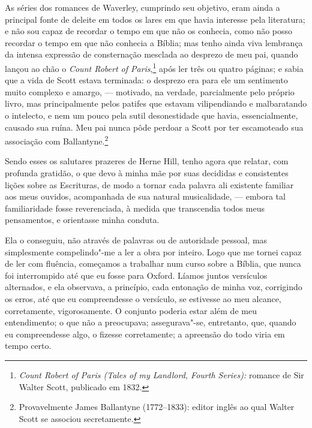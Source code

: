 As séries dos romances de Waverley, cumprindo seu objetivo, eram
ainda a principal fonte de deleite em todos os lares em que havia
interesse pela literatura; e não sou capaz de recordar o tempo em que
não os conhecia, como não posso recordar o tempo em que não conhecia a
Bíblia; mas tenho ainda viva lembrança da intensa expressão de
consternação mesclada ao desprezo de meu pai, quando lançou ao chão o
\textit{Count Robert of Paris},\footnote{\textit{Count Robert of Paris (Tales
  of my Landlord, Fourth Series):} romance de Sir Walter Scott,
  publicado em 1832.} após ler três ou quatro
páginas; e sabia que a vida de Scott estava terminada: o desprezo era
para ele um sentimento muito complexo e amargo, --- motivado, na verdade,
parcialmente pelo próprio livro, mas principalmente pelos patifes que
estavam vilipendiando e malbaratando o intelecto, e nem um pouco pela
sutil desonestidade que havia, essencialmente, causado sua ruína. Meu
pai nunca pôde perdoar a Scott por ter escamoteado sua associação com
Ballantyne.\footnote{Provavelmente James Ballantyne (1772--1833): editor
  inglês ao qual Walter Scott se associou secretamente.}

Sendo esses os salutares prazeres de Herne Hill, tenho agora que
relatar, com profunda gratidão, o que devo à minha mãe por suas
decididas e consistentes lições sobre as Escrituras, de modo a tornar
cada palavra ali existente familiar aos meus ouvidos, acompanhada de sua
natural musicalidade, --- embora tal familiaridade fosse reverenciada, à
medida que transcendia todos meus pensamentos, e orientasse minha
conduta.

Ela o conseguiu, não através de palavras ou de autoridade pessoal, mas
simplesmente compelindo"-me a ler a obra por inteiro. Logo que me tornei
capaz de ler com fluência, começamos a trabalhar num curso sobre a
Bíblia, que nunca foi interrompido até que eu fosse para Oxford. Líamos
juntos versículos alternados, e ela observava, a princípio, cada
entonação de minha voz, corrigindo os erros, até que eu compreendesse o
versículo, se estivesse ao meu alcance, corretamente, vigorosamente. O
conjunto poderia estar além de meu entendimento; o que não a preocupava;
assegurava"-se, entretanto, que, quando eu compreendesse algo, o fizesse
corretamente; a apreensão do todo viria em tempo certo.

